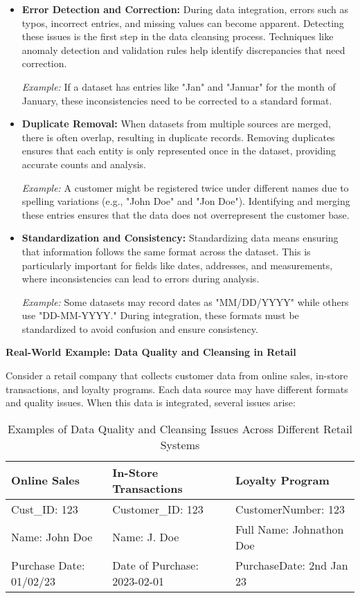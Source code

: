 \documentclass[12pt]{article}
\begin{document}
\begin{itemize}
    \item \textbf{Error Detection and Correction:} During data integration, errors such as typos, incorrect entries, and missing values can become apparent. Detecting these issues is the first step in the data cleansing process. Techniques like anomaly detection and validation rules help identify discrepancies that need correction.

    \textit{Example:} If a dataset has entries like "Jan" and "Januar" for the month of January, these inconsistencies need to be corrected to a standard format.

    \item \textbf{Duplicate Removal:} When datasets from multiple sources are merged, there is often overlap, resulting in duplicate records. Removing duplicates ensures that each entity is only represented once in the dataset, providing accurate counts and analysis.

    \textit{Example:} A customer might be registered twice under different names due to spelling variations (e.g., "John Doe" and "Jon Doe"). Identifying and merging these entries ensures that the data does not overrepresent the customer base.

    \item \textbf{Standardization and Consistency:} Standardizing data means ensuring that information follows the same format across the dataset. This is particularly important for fields like dates, addresses, and measurements, where inconsistencies can lead to errors during analysis.

    \textit{Example:} Some datasets may record dates as "MM/DD/YYYY" while others use "DD-MM-YYYY." During integration, these formats must be standardized to avoid confusion and ensure consistency.
\end{itemize}

\textbf{Real-World Example: Data Quality and Cleansing in Retail}

Consider a retail company that collects customer data from online sales, in-store transactions, and loyalty programs. Each data source may have different formats and quality issues. When this data is integrated, several issues arise:

\begin{table}[h]
    \centering
    \begin{tabular}{|p{4cm}|p{4cm}|p{4cm}|}
        \hline
        \textbf{Online Sales} & \textbf{In-Store Transactions} & \textbf{Loyalty Program} \\ \hline
        Cust\_ID: 123 & Customer\_ID: 123 & CustomerNumber: 123 \\ \hline
        Name: John Doe & Name: J. Doe & Full Name: Johnathon Doe \\ \hline
        Purchase Date: 01/02/23 & Date of Purchase: 2023-02-01 & PurchaseDate: 2nd Jan 23 \\ \hline
    \end{tabular}
    \caption{Examples of Data Quality and Cleansing Issues Across Different Retail Systems}
\end{table}
\end{document}
